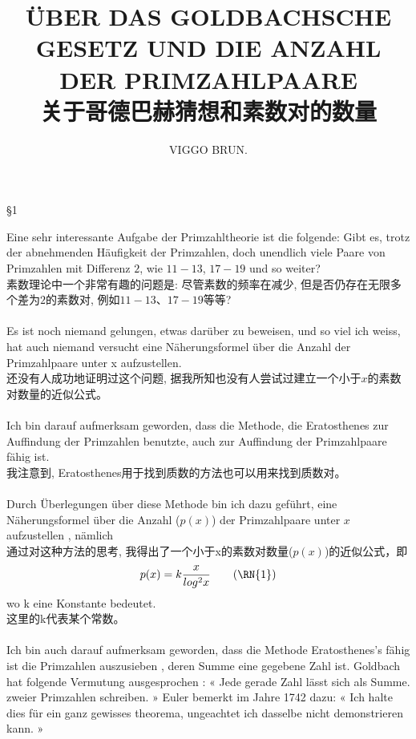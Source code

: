 \documentclass[UTF8,a4paper,zihao=-4]{article}
\title{ÜBER DAS GOLDBACHSCHE GESETZ UND DIE ANZAHL DER PRIMZAHLPAARE\\关于哥德巴赫猜想和素数对的数量}
\begin{document}
\author{VIGGO BRUN.}
\date{}
\maketitle

\begin{center}§1\end{center}

\indent Eine sehr interessante Aufgabe der Primzahltheorie ist die folgende: Gibt es, trotz der abnehmenden Häufigkeit der Primzahlen, doch unendlich viele Paare von Primzahlen mit Differenz $2$, wie $11-13$, $17-19$ und so weiter?\\
\indent 素数理论中一个非常有趣的问题是: 尽管素数的频率在减少, 但是否仍存在无限多个差为$2$的素数对, 例如$11-13$、$17-19$等等?\\\\
\indent Es ist noch niemand gelungen, etwas darüber zu beweisen, und so viel ich weiss, hat auch niemand versucht eine Näherungsformel über die Anzahl der Primzahlpaare unter x aufzustellen.\\
\indent 还没有人成功地证明过这个问题, 据我所知也没有人尝试过建立一个小于$x$的素数对数量的近似公式。\\\\
\indent Ich bin darauf aufmerksam geworden, dass die Methode, die Eratosthenes zur Auffindung der Primzahlen benutzte, auch zur Auffindung der Primzahlpaare fähig ist.\\
\indent 我注意到, Eratosthenes用于找到质数的方法也可以用来找到质数对。\\\\
\indent Durch Überlegungen über diese Methode bin ich dazu geführt, eine Näherungsformel über die Anzahl ($p(x)$) der Primzahlpaare unter $x$ aufzustellen , nämlich\\
\indent 通过对这种方法的思考, 我得出了一个小于x的素数对数量($p(x)$)的近似公式，即
\begin{align}\label{formula_1}
p(x)=k\frac{x}{log^2x}\tag{\RN{1}}
\end{align}
wo k eine Konstante bedeutet.\\
这里的k代表某个常数。\\\\
\indent Ich bin auch darauf aufmerksam geworden, dass die Methode Eratosthenes's fähig ist die Primzahlen auszusieben , deren Summe eine gegebene Zahl ist. Goldbach hat folgende Vermutung ausgesprochen : « Jede gerade Zahl lässt sich als Summe. zweier Primzahlen schreiben. » Euler bemerkt im Jahre 1742 dazu: « Ich halte dies für ein ganz gewisses theorema, ungeachtet ich dasselbe nicht demonstrieren kann. »\\
\end{document}

